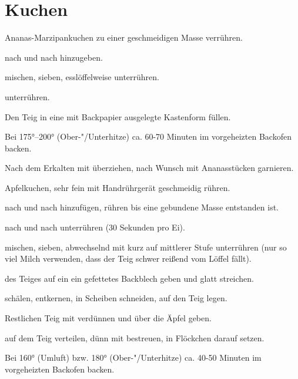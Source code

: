 \section{Kuchen}

\begin{recipe}{Ananas-Marzipankuchen}
  zu einer geschmeidigen Masse verrühren.
  
  nach und nach hinzugeben.
  
  mischen, sieben, esslöffelweise unterrühren.
  
  unterrühren.

  Den Teig in eine mit Backpapier ausgelegte Kastenform füllen.

  Bei 175°--200° (Ober-"/Unterhitze) ca. 60-70 Minuten im
  vorgeheizten Backofen backen.

  Nach dem Erkalten mit
  überziehen, nach Wunsch mit Ananasstücken garnieren.
\end{recipe}



\begin{recipe}{Apfelkuchen, sehr fein}
  mit Handrührgerät geschmeidig rühren.

  nach und nach hinzufügen, rühren bis eine gebundene Masse entstanden
  ist.

  nach und nach unterrühren (30 Sekunden pro Ei).

  mischen, sieben, abwechselnd mit
  kurz auf mittlerer Stufe unterrühren (nur so viel Milch verwenden,
  dass der Teig schwer reißend vom Löffel fällt).

   des Teiges auf ein ein gefettetes Backblech geben und
  glatt streichen.

  schälen, entkernen, in Scheiben schneiden, auf den Teig legen.

  Restlichen Teig mit
  verdünnen und über die Äpfel geben.

  auf dem Teig verteilen, dünn mit
  bestreuen,
  in Flöckchen darauf setzen.

  Bei 160° (Umluft) bzw. 180° (Ober-"/Unterhitze) ca. 40-50 Minuten im
  vorgeheizten Backofen backen.  
  
\end{recipe}



